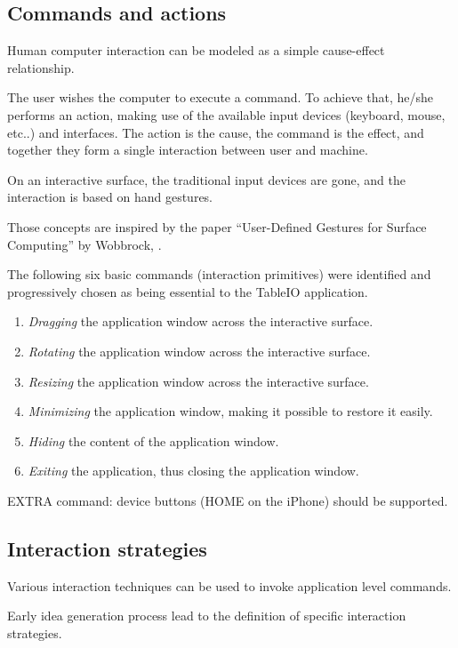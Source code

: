 \subsection{Commands and actions}

Human computer interaction can be modeled as a simple cause-effect relationship.

The user wishes the computer to execute a command.
To achieve that, he/she performs an action, making use of the available input devices (keyboard, mouse, etc..) and interfaces.
The action is the cause, the command is the effect, and together they form a single interaction between user and machine.

On an interactive surface, the traditional input devices are gone, and the interaction is based on hand gestures.

Those concepts are inspired by the paper ``User-Defined Gestures for Surface Computing'' by Wobbrock, \citep{Wobbrock:2009:gestures}.

The following six basic commands (interaction primitives) were identified and progressively chosen as being essential to the TableIO application.

\begin{enumerate}
\item{\emph{Dragging} the application window across the interactive surface.}
\item{\emph{Rotating} the application window across the interactive surface.}
\item{\emph{Resizing} the application window across the interactive surface.}
\item{\emph{Minimizing} the application window, making it possible to restore it easily.}
\item{\emph{Hiding} the content of the application window.}
\item{\emph{Exiting} the application, thus closing the application window.}
\end{enumerate}

EXTRA command: device buttons (HOME on the iPhone) should be supported.

\subsection{Interaction strategies}

Various interaction techniques can be used to invoke application level commands.

Early idea generation process lead to the definition of  specific interaction strategies.

